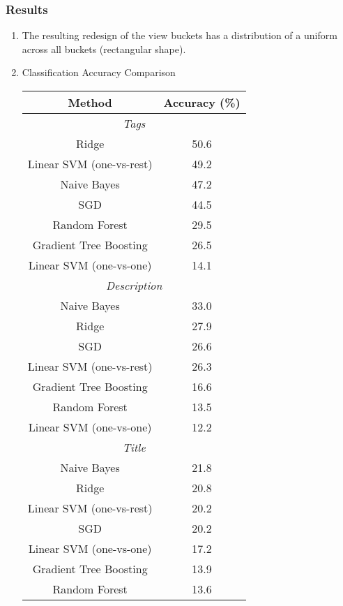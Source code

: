 \documentclass[english]{article}
\begin{document}
\subsubsection{Results}
\begin{enumerate}
\item The resulting redesign of the view buckets has a distribution of a uniform across all buckets (rectangular shape).
\item{Classification Accuracy Comparison}
\begin{table}[H]
\centering
\begin{tabular}{ *2c } 
 \toprule
 \textbf{Method} & \textbf{Accuracy (\%)}\\
 \midrule
 \multicolumn{2}{c}{\textit{Tags}} \\
 \midrule
 Ridge & 50.6 \\
 Linear SVM (one-vs-rest) & 49.2 \\
 Naive Bayes & 47.2 \\
 SGD & 44.5 \\
 Random Forest & 29.5 \\
 Gradient Tree Boosting & 26.5 \\
 Linear SVM (one-vs-one) & 14.1 \\
 \midrule
 \multicolumn{2}{c}{\textit{Description}} \\
 \midrule
 Naive Bayes & 33.0 \\
 Ridge & 27.9 \\
 SGD & 26.6 \\
 Linear SVM (one-vs-rest) & 26.3 \\
 Gradient Tree Boosting & 16.6 \\
 Random Forest & 13.5 \\
 Linear SVM (one-vs-one) & 12.2 \\
 \midrule
 \multicolumn{2}{c}{\textit{Title}} \\
 \midrule
 Naive Bayes & 21.8 \\
 Ridge & 20.8 \\
 Linear SVM (one-vs-rest) & 20.2 \\
 SGD & 20.2 \\
 Linear SVM (one-vs-one) & 17.2 \\
 Gradient Tree Boosting & 13.9 \\
 Random Forest & 13.6 \\
 \bottomrule
\end{tabular}
\label{nnOA}
\end{table}

\end{enumerate}




\newpage



\end{document}

